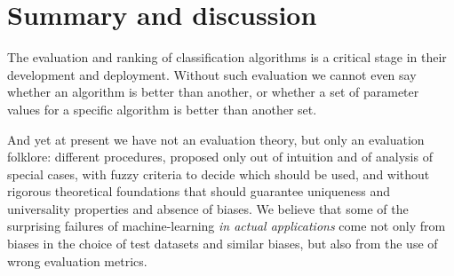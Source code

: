 \documentclass[\ifafour a4paper,12pt,\else a5paper,10pt,\fi%
onecolumn,oneside,article,%
british%
]{memoir}
\theoremstyle{remark}
\theoremstyle{innote}
\renewcommand*{\|}[1][]{\nonscript\:#1\vert\nonscript\:\mathopen{}}
\newcommand*{\eg}{{e.g.}}
\begin{document}
%




\section{Summary and discussion}
\label{sec:discussion}

The evaluation and ranking of classification algorithms is a critical stage in their development and deployment. Without such evaluation we cannot even say whether an algorithm is better than another, or whether a set of parameter values for a specific algorithm is better than another set.

And yet at present we have not an evaluation theory, but only an evaluation folklore: different procedures, proposed only out of intuition and of analysis of special cases, with fuzzy criteria to decide which should be used, and without rigorous theoretical foundations that should guarantee uniqueness and universality properties and absence of biases. We believe that some of the surprising failures of machine-learning \emph{in actual applications}\autocites[see \eg][]{varoquauxetal2022} come not only from biases in the choice of test datasets and similar biases, but also from the use of wrong evaluation metrics.
\end{document}
